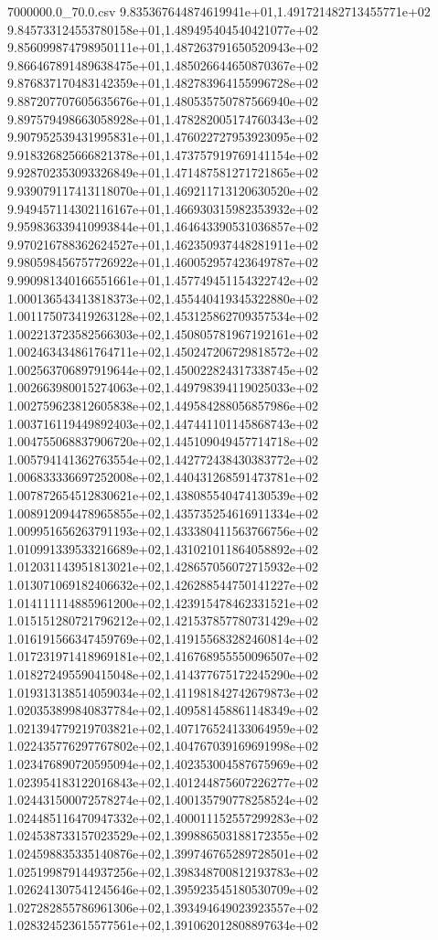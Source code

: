 \begin{filecontents*}{7000000.0_70.0.csv}
9.835367644874619941e+01,1.491721482713455771e+02
9.845733124553780158e+01,1.489495404540421077e+02
9.856099874798950111e+01,1.487263791650520943e+02
9.866467891489638475e+01,1.485026644650870367e+02
9.876837170483142359e+01,1.482783964155996728e+02
9.887207707605635676e+01,1.480535750787566940e+02
9.897579498663058928e+01,1.478282005174760343e+02
9.907952539431995831e+01,1.476022727953923095e+02
9.918326825666821378e+01,1.473757919769141154e+02
9.928702353093326849e+01,1.471487581271721865e+02
9.939079117413118070e+01,1.469211713120630520e+02
9.949457114302116167e+01,1.466930315982353932e+02
9.959836339410993844e+01,1.464643390531036857e+02
9.970216788362624527e+01,1.462350937448281911e+02
9.980598456757726922e+01,1.460052957423649787e+02
9.990981340166551661e+01,1.457749451154322742e+02
1.000136543413818373e+02,1.455440419345322880e+02
1.001175073419263128e+02,1.453125862709357534e+02
1.002213723582566303e+02,1.450805781967192161e+02
1.002463434861764711e+02,1.450247206729818572e+02
1.002563706897919644e+02,1.450022824317338745e+02
1.002663980015274063e+02,1.449798394119025033e+02
1.002759623812605838e+02,1.449584288056857986e+02
1.003716119449892403e+02,1.447441101145868743e+02
1.004755068837906720e+02,1.445109049457714718e+02
1.005794141362763554e+02,1.442772438430383772e+02
1.006833336697252008e+02,1.440431268591473781e+02
1.007872654512830621e+02,1.438085540474130539e+02
1.008912094478965855e+02,1.435735254616911334e+02
1.009951656263791193e+02,1.433380411563766756e+02
1.010991339533216689e+02,1.431021011864058892e+02
1.012031143951813021e+02,1.428657056072715932e+02
1.013071069182406632e+02,1.426288544750141227e+02
1.014111114885961200e+02,1.423915478462331521e+02
1.015151280721796212e+02,1.421537857780731429e+02
1.016191566347459769e+02,1.419155683282460814e+02
1.017231971418969181e+02,1.416768955550096507e+02
1.018272495590415048e+02,1.414377675172245290e+02
1.019313138514059034e+02,1.411981842742679873e+02
1.020353899840837784e+02,1.409581458861148349e+02
1.021394779219703821e+02,1.407176524133064959e+02
1.022435776297767802e+02,1.404767039169691998e+02
1.023476890720595094e+02,1.402353004587675969e+02
1.023954183122016843e+02,1.401244875607226277e+02
1.024431500072578274e+02,1.400135790778258524e+02
1.024485116470947332e+02,1.400011152557299283e+02
1.024538733157023529e+02,1.399886503188172355e+02
1.024598835335140876e+02,1.399746765289728501e+02
1.025199879144937256e+02,1.398348700812193783e+02
1.026241307541245646e+02,1.395923545180530709e+02
1.027282855786961306e+02,1.393494649023923557e+02
1.028324523615577561e+02,1.391062012808897634e+02

\end{filecontents*}
